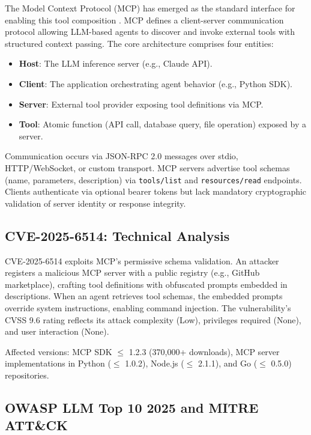 \documentclass[12pt,twocolumn,journal]{IEEEtran}
\begin{document}
The Model Context Protocol (MCP) has emerged as the standard interface for enabling this tool composition \cite{Anthropic2024}. MCP defines a client-server communication protocol allowing LLM-based agents to discover and invoke external tools with structured context passing. The core architecture comprises four entities:

\begin{itemize}
\item \textbf{Host}: The LLM inference server (e.g., Claude API).
\item \textbf{Client}: The application orchestrating agent behavior (e.g., Python SDK).
\item \textbf{Server}: External tool provider exposing tool definitions via MCP.
\item \textbf{Tool}: Atomic function (API call, database query, file operation) exposed by a server.
\end{itemize}

Communication occurs via JSON-RPC 2.0 messages over stdio, HTTP/WebSocket, or custom transport. MCP servers advertise tool schemas (name, parameters, description) via \texttt{tools/list} and \texttt{resources/read} endpoints. Clients authenticate via optional bearer tokens but lack mandatory cryptographic validation of server identity or response integrity.

\subsection{CVE-2025-6514: Technical Analysis}

CVE-2025-6514 exploits MCP's permissive schema validation. An attacker registers a malicious MCP server with a public registry (e.g., GitHub marketplace), crafting tool definitions with obfuscated prompts embedded in descriptions. When an agent retrieves tool schemas, the embedded prompts override system instructions, enabling command injection. The vulnerability's CVSS 9.6 rating reflects its attack complexity (Low), privileges required (None), and user interaction (None).

Affected versions: MCP SDK $\leq$ 1.2.3 (370,000+ downloads), MCP server implementations in Python ($\leq$ 1.0.2), Node.js ($\leq$ 2.1.1), and Go ($\leq$ 0.5.0) repositories.

\subsection{OWASP LLM Top 10 2025 and MITRE ATT\&CK}
\end{document}
